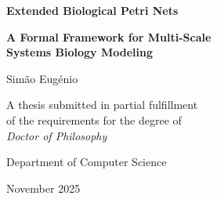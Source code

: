 \begingroup
\thispagestyle{empty}
\begin{center}
    \vspace*{2cm}
    
    {\Large\bfseries Extended Biological Petri Nets\par}
    \vspace{0.5cm}
    {\large\bfseries A Formal Framework for Multi-Scale\\
    Systems Biology Modeling\par}
    
    \vspace{2cm}
    
    {\Large Simão Eugénio\par}
    
    \vspace{2cm}
    
    {\large A thesis submitted in partial fulfillment\\
    of the requirements for the degree of\\
    \textit{Doctor of Philosophy}\par}
    
    \vspace{1.5cm}
    
    {\large Department of Computer Science\\
    [Your University Name]\par}
    
    \vspace{1.5cm}
    
    {\large November 2025\par}
    
    \vfill
\end{center}
\endgroup

